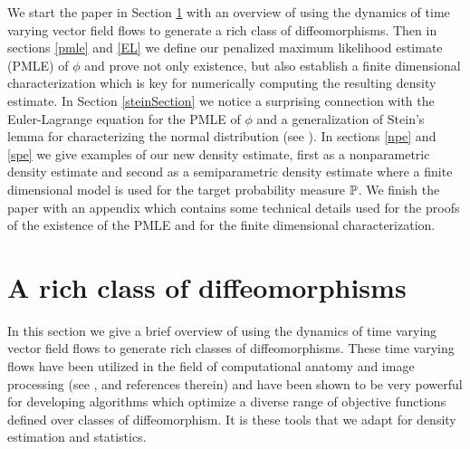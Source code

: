 \documentclass[noinfoline]{imsart}
\begin{document}
We start the paper in Section \ref{rich} with an overview of using the  dynamics of time varying vector field flows to generate a rich class of diffeomorphisms. Then in sections \ref{pmle} and \ref{EL} we define our penalized maximum likelihood estimate (PMLE) of $\phi$ and prove not  only existence, but also establish a  finite dimensional characterization which is key for numerically computing the resulting density estimate. In Section \ref{steinSection} we notice a surprising connection with the Euler-Lagrange equation for the PMLE of $\phi$ and a generalization of Stein's lemma for characterizing the normal distribution (see \cite{stein:04}). In sections \ref{npe} and \ref{spe} we give examples of our new density estimate, first as a nonparametric density estimate and second as a semiparametric density estimate where a finite dimensional model is used for the target probability measure $\Bbb P$. We finish the paper with an appendix which contains some technical details used for the proofs of the existence of the PMLE and for the finite dimensional characterization.


\section{A rich class of diffeomorphisms}
\label{rich}

 In this section we give a brief overview of using the  dynamics of time varying vector field flows to generate rich classes of diffeomorphisms. These time varying flows have been utilized   in the field of computational anatomy and image processing (see \cite{Younes:2008}, and references therein) and have been shown to be very powerful  for developing algorithms which optimize a diverse range of objective functions defined over classes of diffeomorphism.  It is these tools that we adapt for density estimation and statistics.
\end{document}
